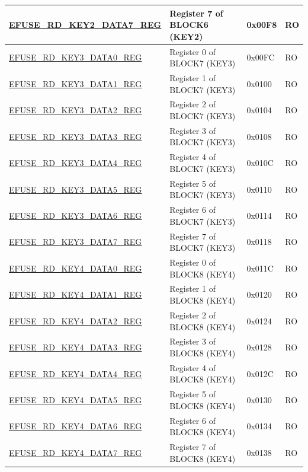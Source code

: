 \begin{longtable}{ | p{5.8cm} | p{7cm} | p{1.3cm} | p{1.2cm} | }
\hyperref[regdesc:EFUSERDKEY2DATA7REG]{EFUSE\_RD\_KEY2\_DATA7\_REG} & Register 7 of BLOCK6 (KEY2) & 0x00F8 & RO \\ \hline
\hyperref[regdesc:EFUSERDKEY3DATA0REG]{EFUSE\_RD\_KEY3\_DATA0\_REG} & Register 0 of BLOCK7 (KEY3) & 0x00FC & RO \\ \hline
\hyperref[regdesc:EFUSERDKEY3DATA1REG]{EFUSE\_RD\_KEY3\_DATA1\_REG} & Register 1 of BLOCK7 (KEY3) & 0x0100 & RO \\ \hline
\hyperref[regdesc:EFUSERDKEY3DATA2REG]{EFUSE\_RD\_KEY3\_DATA2\_REG} & Register 2 of BLOCK7 (KEY3) & 0x0104 & RO \\ \hline
\hyperref[regdesc:EFUSERDKEY3DATA3REG]{EFUSE\_RD\_KEY3\_DATA3\_REG} & Register 3 of BLOCK7 (KEY3) & 0x0108 & RO \\ \hline
\hyperref[regdesc:EFUSERDKEY3DATA4REG]{EFUSE\_RD\_KEY3\_DATA4\_REG} & Register 4 of BLOCK7 (KEY3) & 0x010C & RO \\ \hline
\hyperref[regdesc:EFUSERDKEY3DATA5REG]{EFUSE\_RD\_KEY3\_DATA5\_REG} & Register 5 of BLOCK7 (KEY3) & 0x0110 & RO \\ \hline
\hyperref[regdesc:EFUSERDKEY3DATA6REG]{EFUSE\_RD\_KEY3\_DATA6\_REG} & Register 6 of BLOCK7 (KEY3) & 0x0114 & RO \\ \hline
\hyperref[regdesc:EFUSERDKEY3DATA7REG]{EFUSE\_RD\_KEY3\_DATA7\_REG} & Register 7 of BLOCK7 (KEY3) & 0x0118 & RO \\ \hline
\hyperref[regdesc:EFUSERDKEY4DATA0REG]{EFUSE\_RD\_KEY4\_DATA0\_REG} & Register 0 of BLOCK8 (KEY4) & 0x011C & RO \\ \hline
\hyperref[regdesc:EFUSERDKEY4DATA1REG]{EFUSE\_RD\_KEY4\_DATA1\_REG} & Register 1 of BLOCK8 (KEY4) & 0x0120 & RO \\ \hline
\hyperref[regdesc:EFUSERDKEY4DATA2REG]{EFUSE\_RD\_KEY4\_DATA2\_REG} & Register 2 of BLOCK8 (KEY4) & 0x0124 & RO \\ \hline
\hyperref[regdesc:EFUSERDKEY4DATA3REG]{EFUSE\_RD\_KEY4\_DATA3\_REG} & Register 3 of BLOCK8 (KEY4) & 0x0128 & RO \\ \hline
\hyperref[regdesc:EFUSERDKEY4DATA4REG]{EFUSE\_RD\_KEY4\_DATA4\_REG} & Register 4 of BLOCK8 (KEY4) & 0x012C & RO \\ \hline
\hyperref[regdesc:EFUSERDKEY4DATA5REG]{EFUSE\_RD\_KEY4\_DATA5\_REG} & Register 5 of BLOCK8 (KEY4) & 0x0130 & RO \\ \hline
\hyperref[regdesc:EFUSERDKEY4DATA6REG]{EFUSE\_RD\_KEY4\_DATA6\_REG} & Register 6 of BLOCK8 (KEY4) & 0x0134 & RO \\ \hline
\hyperref[regdesc:EFUSERDKEY4DATA7REG]{EFUSE\_RD\_KEY4\_DATA7\_REG} & Register 7 of BLOCK8 (KEY4) & 0x0138 & RO \\ \hline

\end{longtable}

